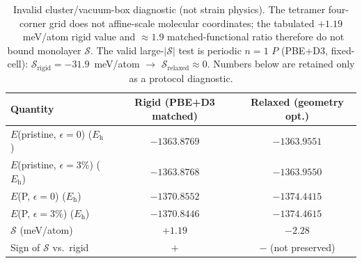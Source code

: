 \begin{table}[t]
\caption{\label{tab:relax}Invalid cluster/vacuum-box diagnostic (not strain physics).
The tetramer four-corner grid does not affine-scale molecular coordinates; the tabulated $+1.19$~meV/atom rigid value and ${\approx}1.9$ matched-functional ratio therefore do not bound monolayer $\mathcal{S}$.
The valid large-$|\mathcal{S}|$ test is periodic $n{=}1$ $P$ (PBE+D3, fixed-cell): $\mathcal{S}_{\mathrm{rigid}}=-31.9$~meV/atom $\rightarrow$ $\mathcal{S}_{\mathrm{relaxed}}{\approx}0$.
Numbers below are retained only as a protocol diagnostic.}
\begin{ruledtabular}
\begin{tabular}{lcc}
Quantity & Rigid (PBE+D3 matched) & Relaxed (geometry opt.) \\
\hline
$E$(pristine, $\epsilon{=}0$) ($E_{\mathrm{h}}$) & $-1363.8769$ & $-1363.9551$ \\
$E$(pristine, $\epsilon{=}3$\%) ($E_{\mathrm{h}}$) & $-1363.8768$ & $-1363.9550$ \\
$E$(P, $\epsilon{=}0$) ($E_{\mathrm{h}}$) & $-1370.8552$ & $-1374.4415$ \\
$E$(P, $\epsilon{=}3$\%) ($E_{\mathrm{h}}$) & $-1370.8446$ & $-1374.4615$ \\
$\mathcal{S}$ (meV/atom) & $+1.19$ & $-2.28$ \\
Sign of $\mathcal{S}$ vs.\ rigid & $+$ & $-$ (not preserved) \\
\end{tabular}
\end{ruledtabular}
\end{table}
